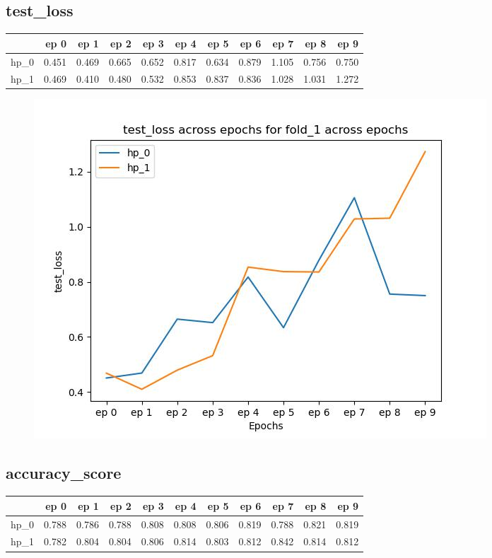 \documentclass{article}
\begin{document}
\subsection{test\_loss}
\begin{tabular}{lrrrrrrrrrr}
\toprule
{} &   ep 0 &   ep 1 &   ep 2 &   ep 3 &   ep 4 &   ep 5 &   ep 6 &   ep 7 &   ep 8 &   ep 9 \\
\midrule
hp\_0 &  0.451 &  0.469 &  0.665 &  0.652 &  0.817 &  0.634 &  0.879 &  1.105 &  0.756 &  0.750 \\
hp\_1 &  0.469 &  0.410 &  0.480 &  0.532 &  0.853 &  0.837 &  0.836 &  1.028 &  1.031 &  1.272 \\
\bottomrule
\end{tabular}

\begin{figure}[H]
\includegraphics[scale = 0.75]{fold_1/test_loss}
\end{figure}
\subsection{accuracy\_score}
\begin{tabular}{lrrrrrrrrrr}
\toprule
{} &   ep 0 &   ep 1 &   ep 2 &   ep 3 &   ep 4 &   ep 5 &   ep 6 &   ep 7 &   ep 8 &   ep 9 \\
\midrule
hp\_0 &  0.788 &  0.786 &  0.788 &  0.808 &  0.808 &  0.806 &  0.819 &  0.788 &  0.821 &  0.819 \\
hp\_1 &  0.782 &  0.804 &  0.804 &  0.806 &  0.814 &  0.803 &  0.812 &  0.842 &  0.814 &  0.812 \\
\bottomrule
\end{tabular}
\end{document}
